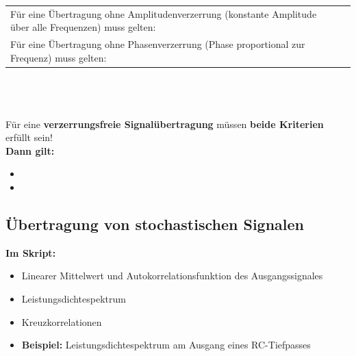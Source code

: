 			\begin{tabularx}{\textwidth}{p{9cm}X}
				Für eine Übertragung ohne Amplitudenverzerrung \newline (konstante Amplitude über alle Frequenzen) muss gelten:
			&	$ $ \newline \fbox{$|H(j\omega)| = konstant$}
			\\
			Für eine Übertragung ohne Phasenverzerrung \newline (Phase proportional zur Frequenz) muss gelten:
			&	$ $ \newline \fbox{$\theta(\omega) = -\omega t_0$}
			\end{tabularx}\\
			\\ \\
			Für eine \textbf{verzerrungsfreie Signalübertragung} müssen \textbf{beide Kriterien} erfüllt sein!\\
			\textbf{Dann gilt:}
			\begin{itemize}
				\item {}
				\item {}
			\end{itemize}
		
		
	\subsection{Übertragung von stochastischen Signalen }
	
		\textbf{Im Skript:}
		\begin{itemize}
			\item Linearer Mittelwert und Autokorrelationsfunktion des Ausgangssignales 
			\item Leistungsdichtespektrum 
			\item Kreuzkorrelationen 
			\item \textbf{Beispiel:} Leistungsdichtespektrum am Ausgang eines RC-Tiefpasses 
		\end{itemize}
		
		
		
		
		
		
		